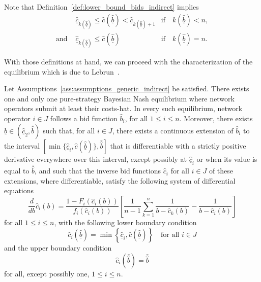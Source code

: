 \noindent Note that Definition~\ref{def:lower_bound_bids_indirect} implies
\begin{equation}
  \label{eq:bounds_lower_bound_bids_cost_indirect}
  \begin{array}{lll}
    &\underline{\hat{c}}_{k(\underline{\hat{b}})} \leq \hat{c}(\underline{\hat{b}}) < \underline{\hat{c}}_{k(\underline{\hat{b}})+1} &\text{if}\quad k(\underline{\hat{b}}) < n,\\
    \text{and } 
    &\underline{\hat{c}}_{k(\underline{\hat{b}})} \leq \hat{c}(\underline{\hat{b}}) &\text{if}\quad k(\underline{\hat{b}}) = n.
  \end{array}
\end{equation}

With those definitions at hand, we can proceed with the characterization of the equilibrium which is due to Lebrun~\cite{Lebrun2006}.
\begin{proposition}
\label{prop:characterization_of_the_equilibrium_indirect}
Let Assumptions~\ref{ass:assumptions_generic_indirect} be satisfied. There exists one and only one pure-strategy Bayesian Nash equilibrium where network operators submit at least their costs-hat. In every such equilibrium, network operator $i\in J$ follows a bid function $\hat{b}_i$, for all $1\leq i\leq n$. Moreover, there exists $\underline{\hat{b}}\in (\underline{\hat{c}}_2, \bar{\hat{b}})$ such that, for all $i\in J$, there exists a continuous extension of $\hat{b}_i$ to the interval $\left[\min\{\underline{\hat{c}}_i, \hat{c}(\underline{\hat{b}})\}, \bar{\hat{b}}\right]$ that is differentiable with a strictly positive derivative everywhere over this interval, except possibly at $\underline{\hat{c}}_i$ or when its value is equal to $\bar{\hat{b}}$, and such that the inverse bid functions $\hat{c}_i$ for all $i\in J$ of these extensions, where differentiable, satisfy the following system of differential equations
\begin{equation}
  \label{eq:foc_ode_indirect}
  \frac{d}{db}\hat{c}_i(b) = \frac{1 - F_i(\hat{c}_i(b))}{f_i(\hat{c}_i(b))}\left[ \frac{1}{n-1}\sum_{k=1}^n \frac{1}{b-\hat{c}_k(b)} - \frac{1}{b-\hat{c}_i(b)} \right]
\end{equation}
for all $1\leq i\leq n$, with the following lower boundary condition
\begin{equation}
  \label{eq:foc_ode_lower_boundary_indirect}
  \hat{c}_i(\underline{\hat{b}}) = \min\left\{\underline{\hat{c}}_i, \hat{c}(\underline{\hat{b}})\right\} \quad\text{for all }i\in J
\end{equation}
and the upper boundary condition
\begin{equation}
  \label{eq:foc_ode_upper_boundary_indirect}
  \hat{c}_i(\bar{\hat{b}}) = \bar{\hat{b}}
\end{equation}
for all, except possibly one, $1\leq i\leq n$.
\end{proposition}
